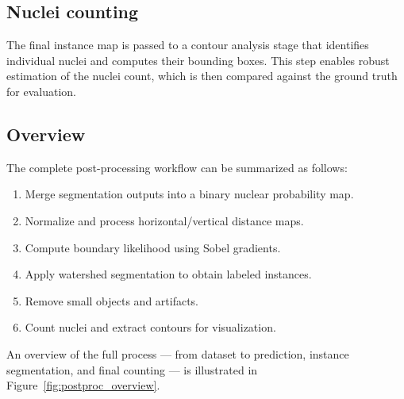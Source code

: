 \documentclass[target=bach,aauheader=,style=]{thud}
\begin{document}
\subsection{Nuclei counting}
The final instance map is passed to a contour analysis stage that identifies individual nuclei and computes their bounding boxes. 
This step enables robust estimation of the nuclei count, which is then compared against the ground truth for evaluation.

\subsection{Overview}
The complete post-processing workflow can be summarized as follows:
\begin{enumerate}
    \item Merge segmentation outputs into a binary nuclear probability map.
    \item Normalize and process horizontal/vertical distance maps.
    \item Compute boundary likelihood using Sobel gradients.
    \item Apply watershed segmentation to obtain labeled instances.
    \item Remove small objects and artifacts.
    \item Count nuclei and extract contours for visualization.
\end{enumerate}

An overview of the full process --- from dataset to prediction, instance segmentation, and final counting --- is illustrated in Figure~\ref{fig:postproc_overview}.
\end{document}
